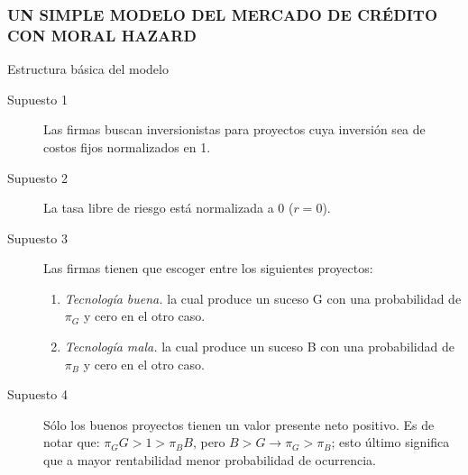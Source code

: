 \documentclass[10pt, xcolor=table, x11names]{beamer}
\begin{document}
\begin{frame}
    \frametitle{{\normalsize UN SIMPLE MODELO DEL MERCADO DE CRÉDITO CON MORAL HAZARD} {}}
    
    \begin{block} {Estructura básica del modelo}
        \begin{description}
            \item[Supuesto 1] Las firmas buscan inversionistas para proyectos cuya inversión sea de costos fijos normalizados en 1.
            \item[Supuesto 2] La tasa libre de riesgo está normalizada a 0 ($r=0$). 
            \item[Supuesto 3] Las firmas tienen que escoger entre los siguientes proyectos:
            \begin{enumerate}
               \item \textit{Tecnología buena.} la cual produce un suceso G con una probabilidad de $\pi_{G} $ y cero en el otro caso.
               \item \textit{Tecnología mala.} la cual produce un suceso B con una probabilidad de $\pi_{B} $ y cero en el otro caso.
            \end{enumerate}
            \item[Supuesto 4] Sólo los buenos proyectos tienen un valor presente neto positivo. Es de notar que: $\pi_{G}G>1>\pi_{B}B $, pero $B>G\rightarrow \pi_{G}>\pi_{B} $; esto último significa que a mayor rentabilidad menor probabilidad de ocurrencia. 
           
             
            \end{description}
        
    \end{block}	
    
\end{frame}
\end{document}
